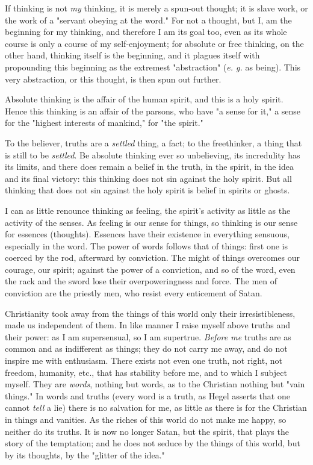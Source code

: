 If thinking is not \textit{my} thinking, it is merely a spun-out thought; it 
is slave work, or the work of a "{}servant obeying at the word."{} For not a 
thought, but I, am the beginning for my thinking, and therefore I am its goal 
too, even as its whole course is only a course of my self-enjoyment; for 
absolute or free thinking, on the other hand, thinking itself is the 
beginning, and it plagues itself with propounding this beginning as the 
extremest "{}abstraction"{} (\textit{e. g.} as being). This very abstraction, 
or this thought, is then spun out further.

Absolute thinking is the affair of the human spirit, and this is a holy 
spirit. Hence this thinking is an affair of the parsons, who have "{}a sense 
for it,"{} a sense for the "{}highest interests of mankind,"{} for "{}the 
spirit."{}

To the believer, truths are a \textit{settled} thing, a fact; to the 
freethinker, a thing that is still to be \textit{settled}. Be absolute 
thinking ever so unbelieving, its incredulity has its limits, and there does 
remain a belief in the truth, in the spirit, in the idea and its final 
victory: this thinking does not sin against the holy spirit. But all thinking 
that does not sin against the holy spirit is belief in spirits or ghosts.

I can as little renounce thinking as feeling, the spirit's activity as little 
as the activity of the senses. As feeling is our sense for things, so thinking 
is our sense for essences (thoughts). Essences have their existence in 
everything sensuous, especially in the word. The power of words follows that 
of things: first one is coerced by the rod, afterward by conviction. The might 
of things overcomes our courage, our spirit; against the power of a 
conviction, and so of the word, even the rack and the sword lose their 
overpoweringness and force. The men of conviction are the priestly men, who 
resist every enticement of Satan.

Christianity took away from the things of this world only their 
irresistibleness, made us independent of them. In like manner I raise myself 
above truths and their power: as I am supersensual, so I am supertrue. 
\textit{Before me} truths are as common and as indifferent as things; they do 
not carry me away, and do not inspire me with enthusiasm. There exists not 
even one truth, not right, not freedom, humanity, etc., that has stability 
before me, and to which I subject myself. They are \textit{words}, nothing but 
words, as to the Christian nothing but "{}vain things."{} In words and truths 
(every word is a truth, as Hegel asserts that one cannot \textit{tell} a lie) 
there is no salvation for me, as little as there is for the Christian in 
things and vanities. As the riches of this world do not make me happy, so 
neither do its truths. It is now no longer Satan, but the spirit, that plays 
the story of the temptation; and he does not seduce by the things of this 
world, but by its thoughts, by the "{}glitter of the idea."{}

